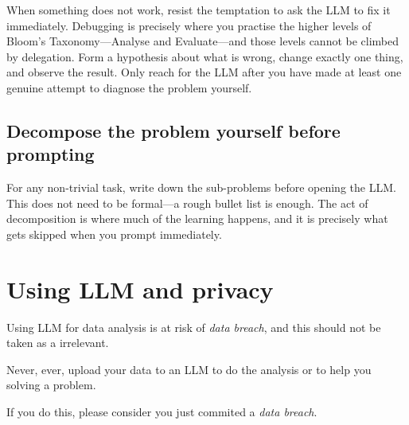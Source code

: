 \documentclass[12pt]{article}
\begin{document}
When something does not work, resist the temptation to ask the LLM to fix it immediately. Debugging is precisely where you practise the higher levels of Bloom's Taxonomy---Analyse and Evaluate---and those levels cannot be climbed by delegation. Form a hypothesis about what is wrong, change exactly one thing, and observe the result. Only reach for the LLM after you have made at least one genuine attempt to diagnose the problem yourself.

\subsection{Decompose the problem yourself before prompting}

For any non-trivial task, write down the sub-problems before opening the LLM. This does not need to be formal---a rough bullet list is enough. The act of decomposition is where much of the learning happens, and it is precisely what gets skipped when you prompt immediately.


\section{Using LLM and privacy}
Using LLM for data analysis is at risk of \emph{data breach}, and this should not be taken as a irrelevant.

\begin{tcolorbox}[
    colback=red!5,
    colframe=red!70!black,
    boxrule=1pt,
    leftrule=4pt,
    arc=2pt,
    colbacktitle=red!70!black,
    title={\textbf{Key Principle}},
    fonttitle=\bfseries\color{white}
]
Never, ever, upload your data to an LLM to do the analysis or to help you solving a problem.
\end{tcolorbox}

If you do this, please consider you just commited a \emph{data breach}.



\end{document}
